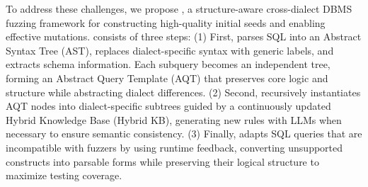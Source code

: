 \documentclass[sigconf,review,anonymous]{acmart}
\begin{document}
To address these challenges, we propose \tool{}, a structure-aware cross-dialect DBMS fuzzing framework for constructing high-quality initial seeds and enabling effective mutations.
\tool{} consists of three steps:
(1) First, \tool{} parses SQL into an Abstract Syntax Tree (AST), replaces dialect-specific syntax with generic labels, and extracts schema information. Each subquery becomes an independent tree, forming an Abstract Query Template (AQT) that preserves core logic and structure while abstracting dialect differences.
(2) Second, \tool{} recursively instantiates AQT nodes into dialect-specific subtrees guided by a continuously updated Hybrid Knowledge Base (Hybrid KB), generating new rules with LLMs when necessary to ensure semantic consistency. 
(3) Finally, \tool{} adapts SQL queries that are incompatible with fuzzers by using runtime feedback, converting unsupported constructs into parsable forms while preserving their logical structure to maximize testing coverage.


\end{document}
